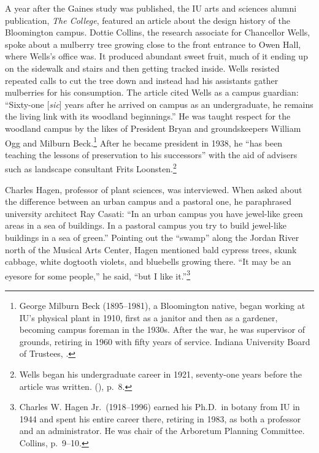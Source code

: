 \documentclass[
  american,
  letterpaper,
]{scrreprt}
\begin{document}
A year after the Gaines study was published, the IU arts and sciences
alumni publication, \emph{The College}, featured an article about the
design history of the Bloomington campus. Dottie Collins, the research
associate for Chancellor Wells, spoke about a mulberry tree growing
close to the front entrance to Owen Hall, where Wells's office was. It
produced abundant sweet fruit, much of it ending up on the sidewalk and
stairs and then getting tracked inside. Wells resisted repeated calls to
cut the tree down and instead had his assistants gather mulberries for
his consumption. The article cited Wells as a campus guardian:
``Sixty-one {[}\emph{sic}{]} years after he arrived on campus as an
undergraduate, he remains the living link with its woodland
beginnings.'' He was taught respect for the woodland campus by the likes
of President Bryan and groundskeepers William Ogg and Milburn
Beck.\footnote{George Milburn Beck (1895--1981), a Bloomington native,
  began working at IU's physical plant in 1910, first as a janitor and
  then as a gardener, becoming campus foreman in the 1930s. After the
  war, he was supervisor of grounds, retiring in 1960 with fifty years
  of service. Indiana University Board of Trustees,
  .}
After he became president in 1938, he ``has been teaching the lessons of
preservation to his successors'' with the aid of advisers such as
landscape consultant Frits Loonsten.\footnote{Wells began his
  undergraduate career in 1921, seventy-one years before the article was
  written. (), p.~8.}

Charles Hagen, professor of plant sciences, was interviewed. When asked
about the difference between an urban campus and a pastoral one, he
paraphrased university architect Ray Casati: ``In an urban campus you
have jewel-like green areas in a sea of buildings. In a pastoral campus
you try to build jewel-like buildings in a sea of green.'' Pointing out
the ``swamp'' along the Jordan River north of the Musical Arts Center,
Hagen mentioned bald cypress trees, skunk cabbage, white dogtooth
violets, and bluebells growing there. ``It may be an eyesore for some
people,'' he said, ``but I like it.''\footnote{Charles W. Hagen
  Jr.~(1918--1996) earned his Ph.D.~in botany from IU in 1944 and spent
  his entire career there, retiring in 1983, as both a professor and an
  administrator. He was chair of the Arboretum Planning Committee.
  Collins{}, p.~9--10.}
\end{document}
